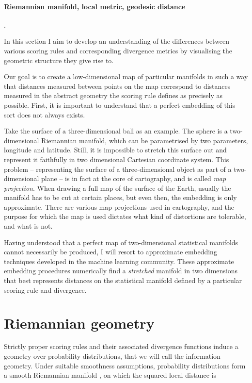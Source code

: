 \paragraph{Riemannian manifold, local metric, geodesic distance}.


In this section I aim to develop an understanding of the differences between various scoring rules and corresponding divergence metrics by visualising the geometric structure they give rise to.

 Our goal is to create a low-dimensional map of particular manifolds in such a way that distances measured between points on the map correspond to distances measured in the abstract geometry the scoring rule defines as precisely as possible. First, it is important to understand that a perfect embedding of this sort does not always exists.

Take the surface of a three-dimensional ball as an example. The sphere is a two-dimensional Riemannian manifold, which can be parametrised by two parameters, longitude and latitude. Still, it is impossible to stretch this surface out and represent it faithfully in two dimensional Cartesian coordinate system. This problem -- representing the surface of a three-dimensional object as part of a two-dimensional plane -- is in fact at the core of cartography, and is called \emph{map projection}. When drawing a full map of the surface of the Earth, usually the manifold has to be cut at certain places, but even then, the embedding is only approximate. There are various map projections used in cartography, and the purpose for which the map is used dictates what kind of distortions are tolerable, and what is not.

Having understood that a perfect map of two-dimensional statistical manifolds cannot necessarily be produced, I will resort to approximate embedding techniques developed in the machine learning community. These approximate embedding procedures numerically find a \emph{stretched} manifold in two dimensions that best represents distances on the statistical manifold defined by a particular scoring rule and divergence.

\section{Riemannian geometry}

Strictly proper scoring rules and their associated divergence functions induce a geometry over probability distributions, that we will call the information geometry. Under suitable smoothness assumptions, probability distributions form a smooth Riemannian manifold \cite{Amari,Dawid}, on which the squared local distance is

